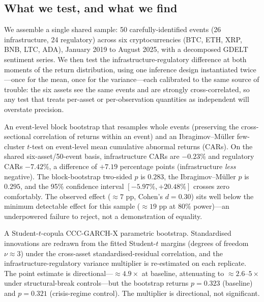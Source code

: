 \documentclass[pdflatex,sn-mathphys-num]{sn-jnl}
\theoremstyle{thmstyleone}
\theoremstyle{thmstyletwo}
\theoremstyle{thmstylethree}
\begin{document}
\subsection{What we test, and what we find}

We assemble a single shared sample: 50 carefully-identified events (26 infrastructure, 24 regulatory) across six cryptocurrencies (BTC, ETH, XRP, BNB, LTC, ADA), January 2019 to August 2025, with a decomposed GDELT sentiment series. We then test the infrastructure-regulatory difference at both moments of the return distribution, using one inference design instantiated twice---once for the mean, once for the variance---each calibrated to the same source of trouble: the six assets see the same events and are strongly cross-correlated, so any test that treats per-asset or per-observation quantities as independent will overstate precision.

\begin{description}[leftmargin=0pt,labelindent=0pt]
\item[First moment (returns).] An event-level block bootstrap that resamples whole events (preserving the cross-sectional correlation of returns within an event) and an Ibragimov--M\"uller few-cluster $t$-test on event-level mean cumulative abnormal returns (CARs). On the shared six-asset/50-event basis, infrastructure CARs are $-0.23\%$ and regulatory CARs $-7.42\%$, a difference of $+7.19$ percentage points (infrastructure \emph{less} negative). The block-bootstrap two-sided $p$ is $0.283$, the Ibragimov--M\"uller $p$ is $0.295$, and the 95\% confidence interval $[-5.97\%, +20.48\%]$ crosses zero comfortably. The observed effect ($\approx 7$ pp, Cohen's $d=0.30$) sits well below the minimum detectable effect for this sample ($\approx 19$ pp at 80\% power)---an underpowered failure to reject, not a demonstration of equality.

\item[Second moment (variance).] A Student-$t$-copula CCC-GARCH-X parametric bootstrap. Standardised innovations are redrawn from the fitted Student-$t$ margins (degrees of freedom $\nu \approx 3$) under the cross-asset standardised-residual correlation, and the infrastructure-regulatory variance multiplier is re-estimated on each replicate. The point estimate is directional---$\approx 4.9\times$ at baseline, attenuating to $\approx 2.6$--$5\times$ under structural-break controls---but the bootstrap returns $p=0.323$ (baseline) and $p=0.321$ (crisis-regime control). The multiplier is directional, not significant.
\end{description}
\end{document}
